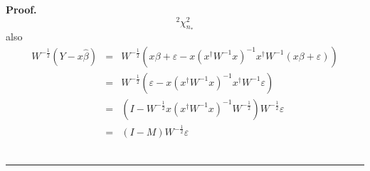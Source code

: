\documentclass{article}
\newenvironment{proof}[1][Proof]{\noindent\textbf{#1.} }{\ \rule{0.5em}{0.5em}}
\begin{document}
\begin{proof}
\begin{equation*}
^{2}\chi _{n_{\ast }}^{2}
\end{equation*}%
also%
\begin{eqnarray*}
W^{-\frac{1}{2}}\left( Y-x\hat{\beta}\right)  &=&W^{-\frac{1}{2}}\left(
x\beta +\varepsilon -x\left( x^{\dagger }W^{-1}x\right) ^{-1}x^{\dagger
}W^{-1}\left( x\beta +\varepsilon \right) \right)  \\
&=&W^{-\frac{1}{2}}\left( \varepsilon -x\left( x^{\dagger }W^{-1}x\right)
^{-1}x^{\dagger }W^{-1}\varepsilon \right)  \\
&=&\left( I-W^{-\frac{1}{2}}x\left( x^{\dagger }W^{-1}x\right) ^{-1}W^{-%
\frac{1}{2}}\right) W^{-\frac{1}{2}}\varepsilon  \\
&=&\left( I-M\right) W^{-\frac{1}{2}}\varepsilon 
\end{eqnarray*}
\end{proof}
\end{document}
